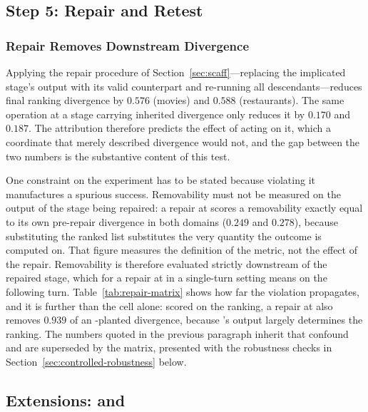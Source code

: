 \subsection{Step 5: Repair and Retest}
\label{sec:controlled-step5}

\subsubsection{Repair Removes Downstream Divergence}
\label{sec:rq4}

Applying the repair procedure of Section~\ref{sec:scaff}---replacing the implicated stage's output
with its valid counterpart and re-running all descendants---reduces final ranking divergence by
$0.576$ (movies) and $0.588$ (restaurants). The same operation at a stage carrying inherited
divergence only reduces it by $0.170$ and $0.187$. The attribution therefore predicts the effect
of acting on it, which a coordinate that merely described divergence would not, and the gap
between the two numbers is the substantive content of this test.

One constraint on the experiment has to be stated because violating it manufactures a spurious
success. Removability must not be measured on the output of the stage being repaired: a repair at
 scores a removability exactly equal to its own pre-repair divergence in both domains
($0.249$ and $0.278$), because substituting the ranked list substitutes the very quantity the
outcome is computed on. That figure measures the definition of the metric, not the effect of the
repair. Removability is therefore evaluated strictly downstream of the repaired stage, which for a
repair at  in a single-turn setting means on the following turn.
Table~\ref{tab:repair-matrix} shows how far the violation propagates, and it is further than the
 cell alone: scored on the ranking, a repair at  also removes $0.939$
of an -planted divergence, because 's output largely determines the
ranking. The numbers quoted in the previous paragraph inherit that confound and are superseded by
the matrix, presented with the robustness checks in Section~\ref{sec:controlled-robustness} below.

\subsection{Extensions:  and }
\label{sec:controlled-extensions}

